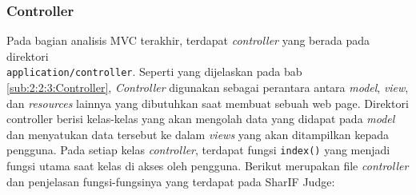 \begin{comment}
      \item 24-Hour Log %
            \begin{figure}[H]
                  \centering
                  \texttt{[image: views/log.png]}
                  \caption{Halaman 24-Hour Log}
                  \label{fig:3:1:1:log}
            \end{figure}

            Gambar \ref{fig:3:1:1:log} menunjukkan halaman 24-Hour Log. Halaman ini hanya dapat di akses oleh \textit{role admin} dan \textit{head instructor}.

\end{itemize}
\end{comment}

\subsubsection{Controller}
\label{sub:3:1:1:controller}

Pada bagian analisis MVC terakhir, terdapat \textit{controller} yang berada pada direktori \\ \verb|application/controller|. Seperti yang dijelaskan pada bab \ref{sub:2:2:3:Controller}, \textit{Controller} digunakan sebagai perantara antara \textit{model}, \textit{view}, dan \textit{resources} lainnya yang dibutuhkan saat membuat sebuah web page. Direktori controller berisi kelas-kelas yang akan mengolah data yang didapat pada \textit{model} dan menyatukan data tersebut ke dalam \textit{views} yang akan ditampilkan kepada pengguna. Pada setiap kelas \textit{controller}, terdapat fungsi \verb|index()| yang menjadi fungsi utama saat kelas di akses oleh pengguna. Berikut merupakan file \textit{controller} dan penjelasan fungsi-fungsinya yang terdapat pada SharIF Judge:

